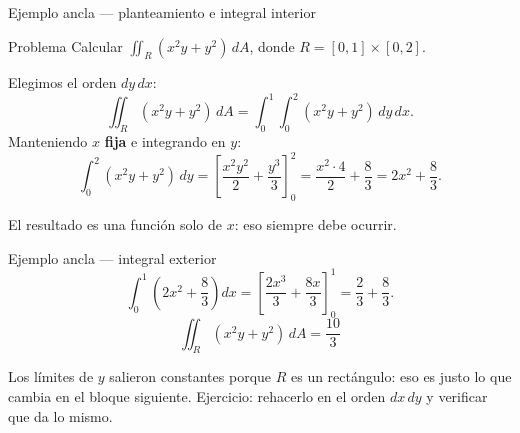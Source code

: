 \documentclass[11pt,aspectratio=169]{beamer}
\begin{document}
\begin{frame}{Ejemplo ancla --- planteamiento e integral interior}
  \begin{block}{Problema}
    Calcular $\displaystyle\iint_R (x^2y+y^2)\,dA$, donde $R=[0,1]\times[0,2]$.
  \end{block}
  \pause
  \vspace{4pt}
  Elegimos el orden $dy\,dx$:
  \[
    \iint_R (x^2y+y^2)\,dA = \int_0^1\!\!\int_0^2 (x^2y+y^2)\,dy\,dx.
  \]
  \pause
  Manteniendo $x$ \textbf{fija} e integrando en $y$:
  \[
    \int_0^2 (x^2y+y^2)\,dy
    = \left[\frac{x^2y^2}{2}+\frac{y^3}{3}\right]_0^2
    = \frac{x^2\cdot4}{2}+\frac83
    = 2x^2+\frac{8}{3}.
  \]
  \pause
  \begin{center}\normalsize\color{tealx}
  El resultado es una función solo de $x$: eso siempre debe ocurrir.
  \end{center}
\end{frame}

\begin{frame}{Ejemplo ancla --- integral exterior}
  \[
    \int_0^1\left(2x^2+\frac{8}{3}\right)dx
    = \left[\frac{2x^3}{3}+\frac{8x}{3}\right]_0^1
    = \frac{2}{3}+\frac{8}{3}.
  \]
  \pause
  \[
    \boxed{\iint_R (x^2y+y^2)\,dA = \frac{10}{3}}
  \]
  \pause
  \vspace{4pt}
  \begin{center}\small\color{gray60}
  Los límites de $y$ salieron constantes porque $R$ es un rectángulo: eso es justo lo que cambia en el bloque siguiente. Ejercicio: rehacerlo en el orden $dx\,dy$ y verificar que da lo mismo.
  \end{center}
\end{frame}

\end{document}
